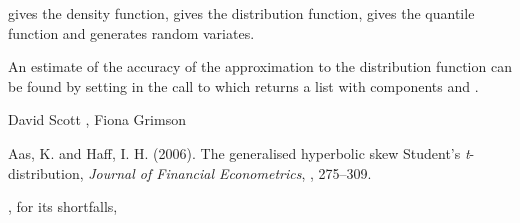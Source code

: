\documentclass{book}
\begin{document}
\begin{Value}
 gives the density function,  gives the
distribution function,  gives the quantile function and
 generates random variates.

An estimate of the accuracy of the approximation to the distribution
function can be found by setting  in the call to
 which returns a list with components  and
.
\end{Value}
\begin{Author}\relax
David Scott , Fiona Grimson
\end{Author}
\begin{References}\relax
Aas, K. and Haff, I. H. (2006).
The generalised hyperbolic skew Student's \emph{t}-distribution,
\emph{Journal of Financial Econometrics}, , 275--309.
\end{References}
\begin{SeeAlso}\relax
{},  for
its shortfalls, 
\end{SeeAlso}
\end{document}
